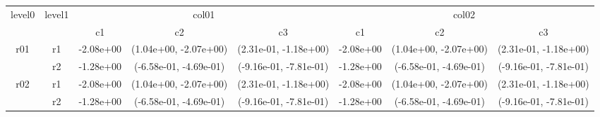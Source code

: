 \begin{tabular}{cccccccc}
\toprule
\multirow{2}{*}{level0} & \multirow{2}{*}{level1}&\multicolumn{3}{c}{col01}&\multicolumn{3}{c}{col02}\tabularnewline
\cmidrule(lr){3-5}
\cmidrule(lr){6-8}
&&c1&c2&c3&c1&c2&c3\tabularnewline
\midrule
\midrule
\multirow{2}{*}{r01}&r1&-2.08e+00& (1.04e+00, -2.07e+00)& (2.31e-01, -1.18e+00)&-2.08e+00& (1.04e+00, -2.07e+00)& (2.31e-01, -1.18e+00)\tabularnewline
&r2&-1.28e+00& (-6.58e-01, -4.69e-01)& (-9.16e-01, -7.81e-01)&-1.28e+00& (-6.58e-01, -4.69e-01)& (-9.16e-01, -7.81e-01)\tabularnewline
\midrule
\multirow{2}{*}{r02}&r1&-2.08e+00& (1.04e+00, -2.07e+00)& (2.31e-01, -1.18e+00)&-2.08e+00& (1.04e+00, -2.07e+00)& (2.31e-01, -1.18e+00)\tabularnewline
&r2&-1.28e+00& (-6.58e-01, -4.69e-01)& (-9.16e-01, -7.81e-01)&-1.28e+00& (-6.58e-01, -4.69e-01)& (-9.16e-01, -7.81e-01)\tabularnewline
\bottomrule
\end{tabular}
